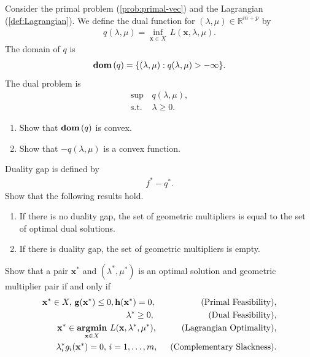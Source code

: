 \documentclass[11pt,letter,notitlepage]{article}
\DeclareMathOperator*{\argmin}{\bf argmin}
\DeclareMathOperator*{\dom}{\bf dom\,}
\begin{document}
\newpage
\begin{exercise}
Consider the primal problem (\ref{prob:primal-vec}) and the Lagrangian (\ref{def:Lagrangian}). We define the dual function for $(\lambda,\mu)\in\mathbb{R}^{m+p}$ by
\begin{align*}
	q(\lambda,\mu)=\inf_{\mathbf{x}\in X}\,L(\mathbf{x},\lambda,\mu).
\end{align*}
The domain of $q$ is 
\begin{align*}
    \dom(q)=\{(\lambda,\mu):q(\lambda,\mu)>-\infty\}.
\end{align*}
The dual problem is
\begin{align*}
	\sup\,&q(\lambda,\mu),\\
	\mbox{s.t. }&\lambda\geq0.
\end{align*}
\begin{enumerate}
    \item Show that $\dom(q)$ is convex.
    \item Show that $-q(\lambda,\mu)$ is a convex function.
\end{enumerate}
\end{exercise}





\newpage
\begin{exercise}
Duality gap is defined by
	\begin{align*}
		f^*-q^*.
	\end{align*}
	Show that the following results hold.
	\begin{enumerate}
		\item If there is no duality gap, the set of geometric multipliers is equal to the set of optimal dual solutions.
		\item If there is duality gap, the set of geometric multipliers is empty.
	\end{enumerate}
\end{exercise}

\newpage
\begin{exercise}
	Show that a pair $\mathbf{x}^*$ and $(\lambda^*,\mu^*)$ is an optimal solution and geometric multiplier pair if and only if
	\begin{align}\label{cond:primal-feasibility}
		\mathbf{x}^*\in X,\,\mathbf{g}(\mathbf{x}^*)\leq0,\mathbf{h}(\mathbf{x}^*)=0,\hspace{18.5mm}(\mbox{\textup{Primal Feasibility}}),&\\ \label{cond:dual-feasibility}
		\lambda^*\geq0,\hspace{22mm}(\mbox{\textup{Dual Feasibility}}),&\\ \label{cond:lagrangian-optimality}
		\mathbf{x}^*\in\argmin_{\mathbf{x}\in X}\,L(\mathbf{x},\lambda^*,\mu^*),\hspace{10mm}(\mbox{\textup{Lagrangian Optimality}}),&\\ \label{cond:complementary-slackness}
		\lambda^*_ig_i(\mathbf{x}^*)=0,\,i=1,\ldots,m,\hspace{5mm}(\mbox{\textup{Complementary Slackness}}).&
	\end{align}
\end{exercise}
\end{document}

